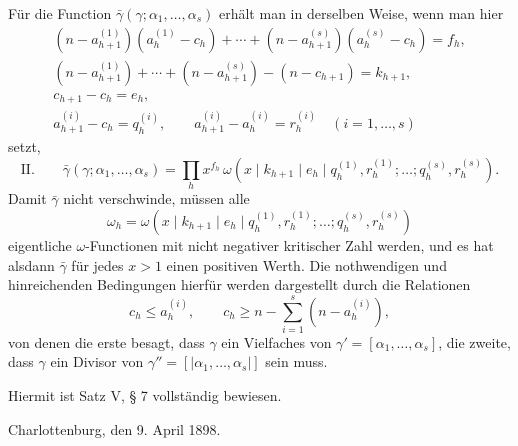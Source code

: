 Für die Function $\bar\gamma(\gamma;\alpha_1,
\ldots,\alpha_s)$ erhält man in derselben Weise, wenn man hier
\[
\begin{gathered}
 (n-a_{h+1}^{(1)})(a_h^{(1)}-c_h)+\cdots+(n-a_{h+1}^{(s)})(a_h^{(s)}-c_h)=f_h,\\
 (n-a_{h+1}^{(1)})+\cdots+(n-a_{h+1}^{(s)})-(n-c_{h+1})=k_{h+1},\\
 c_{h+1}-c_h=e_h,\\
 a_{h+1}^{(i)}-c_h=q_h^{(i)},
 \qquad a_{h+1}^{(i)}-a_h^{(i)}=r_h^{(i)}\quad(i=1,\ldots,s)
\end{gathered}
\]
setzt,
\[
\text{II.}\qquad
 \bar\gamma(\gamma;\alpha_1,
\ldots,\alpha_s)=\prod_h x^{f_h}\,
 \omega(x\mid k_{h+1}\mid e_h\mid q_h^{(1)},r_h^{(1)};\ldots;q_h^{(s)},r_h^{(s)}).
\]
Damit $\bar\gamma$ nicht verschwinde, müssen alle
\[
 \omega_h=\omega(x\mid k_{h+1}\mid e_h\mid q_h^{(1)},r_h^{(1)};\ldots;q_h^{(s)},r_h^{(s)})
\]
eigentliche $\omega$-Functionen mit nicht negativer kritischer Zahl werden, und es hat alsdann $\bar\gamma$ für jedes $x>1$ einen positiven Werth. Die nothwendigen und hinreichenden Bedingungen hierfür werden dargestellt durch die Relationen
\[
 c_h\le a_h^{(i)},
 \qquad
 c_h\ge n-\sum_{i=1}^s(n-a_h^{(i)}),
\]
von denen die erste besagt, dass $\gamma$ ein Vielfaches von $\gamma'=[\alpha_1,
\ldots,\alpha_s]$, die zweite, dass $\gamma$ ein Divisor von $\gamma''=[|\alpha_1,
\ldots,\alpha_s|]$ sein muss.

Hiermit ist Satz V, § 7 vollständig bewiesen.

Charlottenburg, den 9. April 1898.
